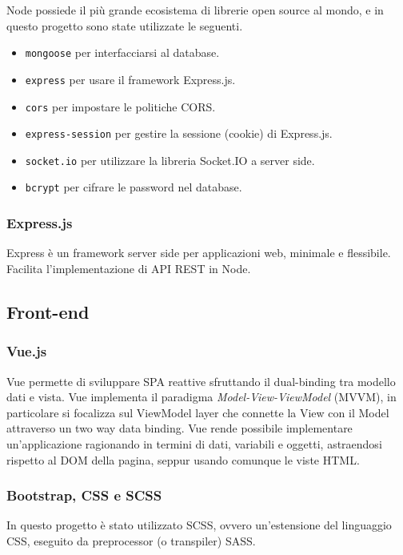 Node possiede il più grande ecosistema di librerie open source al mondo, e in questo progetto sono state utilizzate le seguenti.
\begin{itemize}
\item
	\texttt{mongoose} per interfacciarsi al database.
\item
	\texttt{express} per usare il framework Express.js.
\item
	\texttt{cors} per impostare le politiche CORS.
\item
	\texttt{express-session} per gestire la sessione (cookie) di Express.js.
\item
	\texttt{socket.io} per utilizzare la libreria Socket.IO a server side.
\item
	\texttt{bcrypt} per cifrare le password nel database.
\end{itemize}

\subsubsection{Express.js}

Express è un framework server side per applicazioni web, minimale e flessibile. Facilita l'implementazione di API REST in Node.

\newpage

\subsection{Front-end}

\subsubsection{Vue.js}

Vue permette di sviluppare SPA reattive sfruttando il dual-binding tra modello dati e vista. Vue implementa il paradigma \emph{Model-View-ViewModel} (MVVM), in particolare si focalizza sul ViewModel layer che connette la View con il Model attraverso un two way data binding. Vue rende possibile implementare un'applicazione ragionando in termini di dati, variabili e oggetti, astraendosi rispetto al DOM della pagina, seppur usando comunque le viste HTML.

\subsubsection{Bootstrap, CSS e SCSS}

In questo progetto è stato utilizzato SCSS, ovvero un'estensione del linguaggio CSS, eseguito da preprocessor (o transpiler) SASS.

